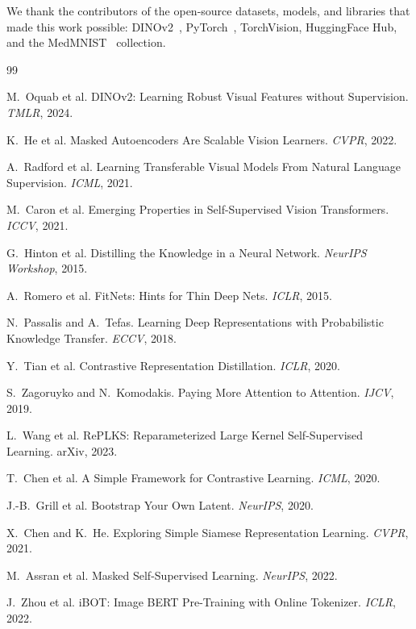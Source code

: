\documentclass{article}
\begin{document}
We thank the contributors of the open-source datasets, models, and libraries that made this work possible: DINOv2~\cite{dino2}, PyTorch~\cite{pytorch}, TorchVision, HuggingFace Hub, and the MedMNIST~\cite{medmnist} collection.

\begin{thebibliography}{99}

 M.~Oquab et al. DINOv2: Learning Robust Visual Features without Supervision. \textit{TMLR}, 2024.

 K.~He et al. Masked Autoencoders Are Scalable Vision Learners. \textit{CVPR}, 2022.

 A.~Radford et al. Learning Transferable Visual Models From Natural Language Supervision. \textit{ICML}, 2021.

 M.~Caron et al. Emerging Properties in Self-Supervised Vision Transformers. \textit{ICCV}, 2021.

 G.~Hinton et al. Distilling the Knowledge in a Neural Network. \textit{NeurIPS Workshop}, 2015.

 A.~Romero et al. FitNets: Hints for Thin Deep Nets. \textit{ICLR}, 2015.

 N.~Passalis and A.~Tefas. Learning Deep Representations with Probabilistic Knowledge Transfer. \textit{ECCV}, 2018.

 Y.~Tian et al. Contrastive Representation Distillation. \textit{ICLR}, 2020.

 S.~Zagoruyko and N.~Komodakis. Paying More Attention to Attention. \textit{IJCV}, 2019.

 L.~Wang et al. RePLKS: Reparameterized Large Kernel Self-Supervised Learning. arXiv, 2023.

 T.~Chen et al. A Simple Framework for Contrastive Learning. \textit{ICML}, 2020.

 J.-B.~Grill et al. Bootstrap Your Own Latent. \textit{NeurIPS}, 2020.

 X.~Chen and K.~He. Exploring Simple Siamese Representation Learning. \textit{CVPR}, 2021.

 M.~Assran et al. Masked Self-Supervised Learning. \textit{NeurIPS}, 2022.

 J.~Zhou et al. iBOT: Image BERT Pre-Training with Online Tokenizer. \textit{ICLR}, 2022.


\end{thebibliography}
\end{document}
